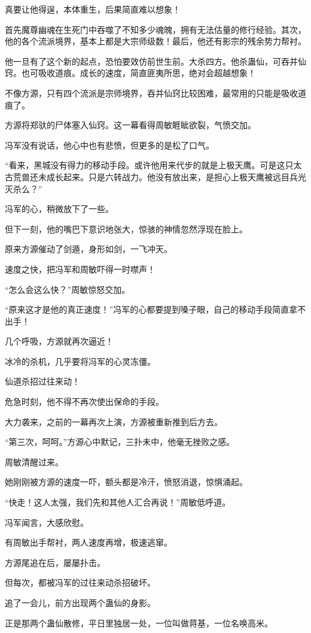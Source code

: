 \begin{this_body}
真要让他得逞，本体重生，后果简直难以想象！

首先魔尊幽魂在生死门中吞噬了不知多少魂魄，拥有无法估量的修行经验。其次，他的各个流派境界，基本上都是大宗师级数！最后，他还有影宗的残余势力帮衬。

他一旦有了这个新的起点，恐怕要效仿前世生前。大杀四方。他杀蛊仙，可吞并仙窍。也可吸收道痕。成长的速度，简直匪夷所思，绝对会超越想象！

不像方源，只有四个流派是宗师境界，吞并仙窍比较困难，最常用的只能是吸收道痕了。

方源将郑驮的尸体塞入仙窍。这一幕看得周敏睚眦欲裂，气愤交加。

冯军没有说话，他心中也有悲愤，但更多的是松了口气。

“看来，黑城没有得力的移动手段。或许他用来代步的就是上极天鹰。可是这只太古荒兽还未成长起来。只是六转战力。他没有放出来，是担心上极天鹰被远目兵光灭杀么？”

冯军的心，稍微放下了一些。

但下一刻，他的嘴巴下意识地张大，惊骇的神情忽然浮现在脸上。

原来方源催动了剑遁，身形如剑，一飞冲天。

速度之快，把冯军和周敏吓得一时噤声！

“怎么会这么快？”周敏惊怒交加。

“原来这才是他的真正速度！”冯军的心都要提到嗓子眼，自己的移动手段简直拿不出手！

几个呼吸，方源就再次逼近！

冰冷的杀机，几乎要将冯军的心灵冻僵。

仙道杀招过往来动！

危急时刻，他不得不再次使出保命的手段。

大力袭来，之前的一幕再次上演，方源被重新推到后方去。

“第三次，呵呵。”方源心中默记，三扑未中，他毫无挫败之感。

周敏清醒过来。

她刚刚被方源的速度一吓，额头都是冷汗，愤怒消退，惊惧涌起。

“快走！这人太强，我们先和其他人汇合再说！”周敏低呼道。

冯军闻言，大感欣慰。

有周敏出手帮衬，两人速度再增，极速逃窜。

方源尾追在后，屡屡扑击。

但每次，都被冯军的过往来动杀招破坏。

追了一会儿，前方出现两个蛊仙的身影。

正是那两个蛊仙散修，平日里独居一处，一位叫做蒋基，一位名唤高米。


\end{this_body}
